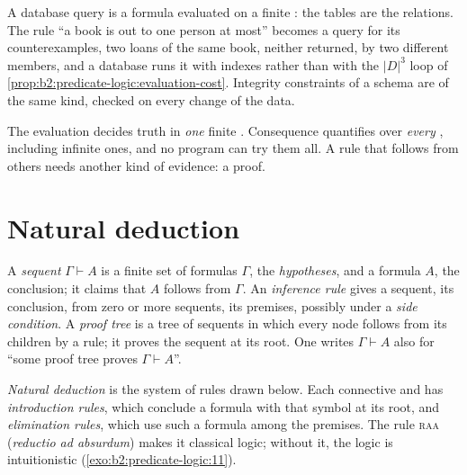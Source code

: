 \label{out:b2:predicate-logic:cost}

\begin{inpractice}
A database query is a formula evaluated on a finite : the tables are the relations. The rule ``a book is out
to one person at most'' becomes a query for its counterexamples, two loans of the same book, neither returned, by two
different members, and a database runs it with indexes rather than with the $|D|^3$ loop of
\cref{prop:b2:predicate-logic:evaluation-cost}. Integrity constraints of a schema are  of the same kind,
checked on every change of the data.
\end{inpractice}

The evaluation decides truth in \emph{one} finite . Consequence quantifies over \emph{every} ,
including infinite ones, and no program can try them all. A rule that follows from others needs another kind of
evidence: a proof.

\section{Natural deduction}\label{sec:b2:predicate-logic:natural-deduction}

\begin{definition}\label{def:b2:predicate-logic:sequent}
A \emph{sequent} $\Gamma \vdash A$ is a finite set of formulas $\Gamma$, the \emph{hypotheses}, and a
formula $A$, the conclusion; it claims that $A$ follows from $\Gamma$. An \emph{inference rule}
gives a sequent, its conclusion, from zero or more sequents, its premises, possibly under a \emph{side condition}. A
\emph{proof tree} is a tree of sequents in which every node follows from its children by a rule; it
proves the sequent at its root. One writes $\Gamma \vdash A$ also for ``some proof tree proves $\Gamma \vdash A$''.
\end{definition}

\begin{definition}\label{def:b2:predicate-logic:nd}
\emph{Natural deduction} is the system of rules drawn below.
Each connective and  has \emph{introduction rules}, which conclude a formula with that
symbol at its root, and \emph{elimination rules}, which use such a formula among the premises.
The rule \textsc{raa} (\emph{reductio ad absurdum}) makes it classical logic; without it, the logic is
intuitionistic (\cref{exo:b2:predicate-logic:11}).
\end{definition}

